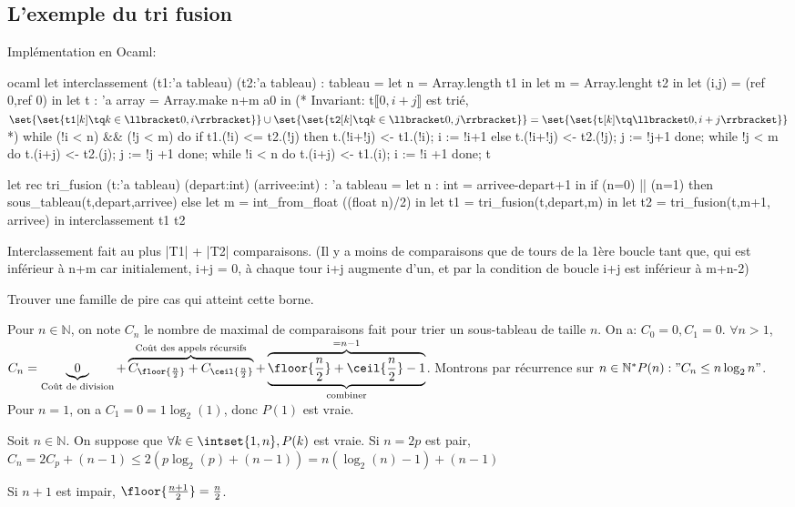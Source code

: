 \documentclass{scrartcl}
\begin{document}
		\subsection{L'exemple du tri fusion}
			Implémentation en Ocaml:
			\begin{code}{ocaml}
				let interclassement (t1:'a tableau) (t2:'a tableau) : tableau =
					let n = Array.length t1 in
					let m = Array.lenght t2 in
					let (i,j) = (ref 0,ref 0) in
					let t : 'a array = Array.make n+m a0 in
					(* Invariant: t$\llbracket 0,i+j \rrbracket$ est trié, $\set{\set{\mathtt{t1}[k] \tq k \in \llbracket 0,i \rrbracket}} \cup \set{\set{\mathtt{t2}[k] \tq k \in \llbracket 0,j \rrbracket }} = \set{\set{\mathtt{t}[k] \tq \llbracket 0, i+j \rrbracket}}$*)
					while (!i < n) && (!j < m) do
						if t1.(!i) <= t2.(!j) then
							t.(!i+!j) <- t1.(!i);
							i := !i+1
						else
							t.(!i+!j) <- t2.(!j);
							j := !j+1
					done; 
					while !j < m do
						t.(i+j) <- t2.(j);
						j := !j +1
					done;
					while !i < n do
						t.(i+j) <- t1.(i);
						i := !i +1
					done; t

				let rec tri_fusion (t:'a tableau) (depart:int) (arrivee:int) : 'a tableau =
					let n : int = arrivee-depart+1 in
					if (n=0) || (n=1) then sous_tableau(t,depart,arrivee)
					else 
						let m = int_from_float ((float n)/2) in
						let t1 = tri_fusion(t,depart,m) in
						let t2 = tri_fusion(t,m+1, arrivee) in
						interclassement t1 t2
			\end{code}

			Interclassement fait au plus |T1| + |T2| comparaisons. (Il y a moins de comparaisons que de tours de la 1ère boucle tant que, 
			qui est inférieur à n+m car initialement, i+j = 0, à chaque tour i+j augmente d'un, et par la condition de boucle i+j est inférieur à m+n-2)

			\exo Trouver une famille de pire cas qui atteint cette borne. 

			Pour $n \in \mathbb{N}$, on note $C_n$ le nombre de maximal de comparaisons
			fait pour trier un sous-tableau de taille $n$. On a:
			$C_0 = 0, C_1=0$.
			$\forall n > 1$, $C_n = \underbrace{0}_\text{Coût de division} + \overbrace{C_{\floor{\frac{n}{2}}} + C_{\ceil{\frac{n}{2}}}}^\text{Coût des appels récursifs} 
			+ \underbrace{\overbrace{\floor{{n \over 2}} + \ceil{{n \over 2}} - 1}^{=n-1}}_\text{combiner}$.
			Montrons par récurrence sur $n \in \mathbb{N}^* P(n): "C_n \leq n\log_2{n}"$. 
			Pour $n=1$, on a $C_1 = 0 = 1\log_2(1)$, donc $P(1)$ est vraie.
			
			Soit $n \in \mathbb{N}$. On suppose que $\forall k \in \intset{1,n}, P(k)$ est vraie. Si $n = 2p$ est pair, 
			$C_n = 2C_p + (n-1) \leq 2(p\log_2(p) + (n-1)) = n(\log_2(n)-1) + (n-1)$  

			Si $n+1$ est impair, $\floor{\frac{n+1}{2}} = \frac{n}{2}$.
\end{document}
